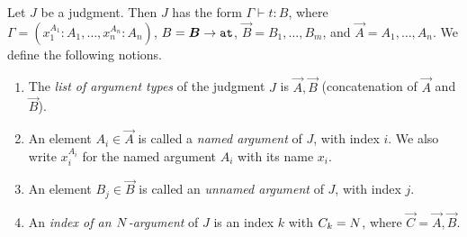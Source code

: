 \begin{definition}
Let $J$ be a judgment.
Then $J$ has the form $\Gamma \vdash t:B$,
where $\Gamma = (x_1^{A_1}:A_1,\ldots, x_n^{A_n}:A_n)$, 
$B = \vec{B}\rightarrow \Atom$,
$\vec{B}=B_{1}, \ldots, B_{m}$, and $\vec{A} = A_1,\ldots,A_n$. 
We define the following notions. 
\begin{enumerate}
\item
The \emph{list of argument types} of the judgment $J$ is $\vec{A},\vec{B}$ (concatenation of $\vec{A}$ and $\vec{B}$).

\item
An element $A_i \in \vec{A}$ is called a \emph{named argument} of $J$, with index $i$.
We also write $x_i^{A_i}$ for the named argument $A_i$ with its name $x_i$.
    
\item
An element $B_j \in \vec{B}$ is called an \emph{unnamed argument} of $J$, with
index $j$. 

\item
An \emph{index of an ${N}$-argument} 
of $J$ is an index $k$ with $C_k = {N}$, where $\vec{C} = \vec{A},\vec{B}$.

\end{enumerate}
\end{definition}

